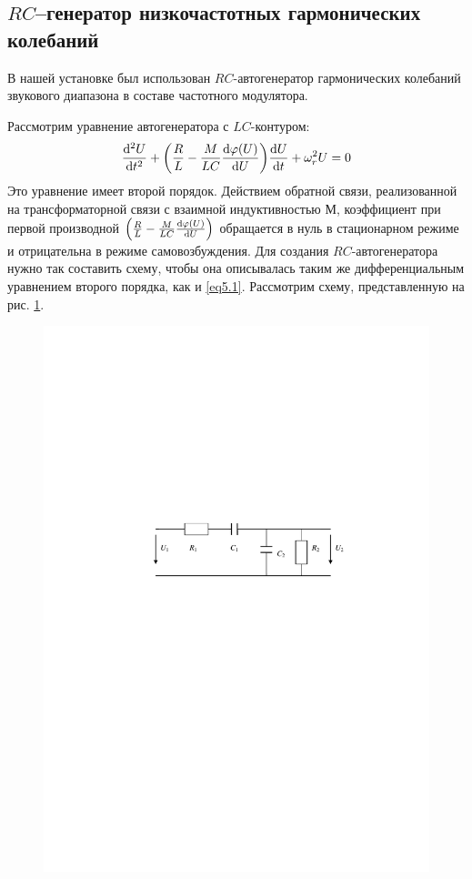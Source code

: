 \documentclass[a4paper,12pt]{article}
\begin{document}
\subsection{$RC$--генератор низкочастотных гармонических колебаний}

В нашей установке был использован $RC$-автогенератор гармонических колебаний звукового диапазона в составе частотного модулятора.

Рассмотрим уравнение автогенератора с $LC$-контуром:
\begin{gather}
	\label{eq5.1}
	\dv[2]{U}{t}+
	\qty(
		\frac{R}{L} - 
		\frac{M}{LC}\dv{\varphi(U)}{U}
	)\dv{U}{t}+
	\omega_r^2U=0
\end{gather}
Это уравнение имеет второй порядок. Действием обратной связи, реализованной на трансформаторной связи с взаимной индуктивностью $М$, коэффициент при первой производной 
$\qty(
	\frac{R}{L} - 
	\frac{M}{LC}\dv{\varphi(U)}{U}
)$  
обращается в нуль в стационарном режиме и отрицательна в режиме самовозбуждения. Для создания $RC$-автогенератора нужно так составить схему, чтобы она описывалась таким же дифференциальным уравнением второго порядка, как и \eqref{eq5.1}. Рассмотрим схему, представленную на рис. \ref{fig:5.1}. 
\begin{figure}[H]
	\centering
	\includegraphics[]{fig/fig5-1.pdf}
	\caption{}
	\label{fig:5.1}
\end{figure}
\end{document}
